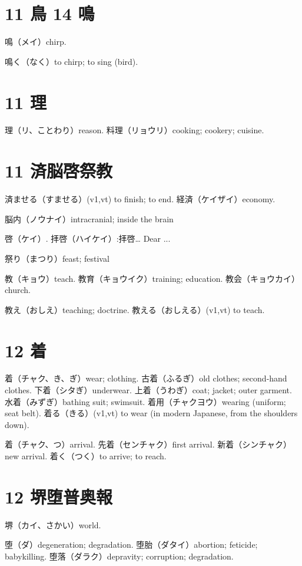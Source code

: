 \section{11 鳥 14 鳴}

鳴（メイ）chirp.

鳴く（なく）to chirp; to sing (bird).

\section{11 理}

理（リ、ことわり）reason.
料理（リョウリ）cooking; cookery; cuisine.

\section{11 済脳啓祭教}

済ませる（すませる）(v1,vt) to finish; to end.
経済（ケイザイ）economy.

脳内（ノウナイ）intracranial; inside the brain

啓（ケイ）.
拝啓（ハイケイ）:拝啓… Dear ...

祭り（まつり）feast; festival

教（キョウ）teach.
教育（キョウイク）training; education.
教会（キョウカイ）church.

教え（おしえ）teaching; doctrine.
教える（おしえる）(v1,vt) to teach.

\section{12 着}

着（チャク、き、ぎ）wear; clothing.
古着（ふるぎ）old clothes; second-hand clothes.
下着（シタぎ）underwear.
上着（うわぎ）coat; jacket; outer garment.
水着（みずぎ）bathing suit; swimsuit.
着用（チャクヨウ）wearing (uniform; seat belt).
着る（きる）(v1,vt) to wear (in modern Japanese, from the shoulders down).

着（チャク、つ）arrival.
先着（センチャク）first arrival.
新着（シンチャク）new arrival.
着く（つく）to arrive; to reach.

\section{12 堺堕普奥報}

堺（カイ、さかい）world.

堕（ダ）degeneration; degradation.
堕胎（ダタイ）abortion; feticide; babykilling.
堕落（ダラク）depravity; corruption; degradation.

